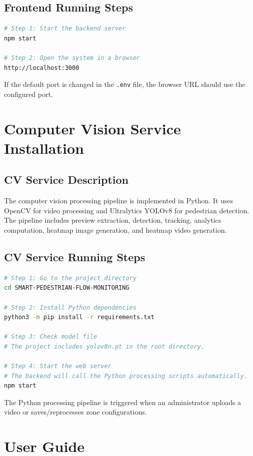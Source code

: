 \documentclass[12pt,a4paper]{report}
\begin{document}
\subsection{Frontend Running Steps}

\begin{lstlisting}[language=bash]
# Step 1: Start the backend server
npm start

# Step 2: Open the system in a browser
http://localhost:3000
\end{lstlisting}

If the default port is changed in the \texttt{.env} file, the browser URL should use the configured port.

\section{Computer Vision Service Installation}

\subsection{CV Service Description}

The computer vision processing pipeline is implemented in Python. It uses OpenCV for video processing and Ultralytics YOLOv8 for pedestrian detection. The pipeline includes preview extraction, detection, tracking, analytics computation, heatmap image generation, and heatmap video generation.

\subsection{CV Service Running Steps}

\begin{lstlisting}[language=bash]
# Step 1: Go to the project directory
cd SMART-PEDESTRIAN-FLOW-MONITORING

# Step 2: Install Python dependencies
python3 -m pip install -r requirements.txt

# Step 3: Check model file
# The project includes yolov8n.pt in the root directory.

# Step 4: Start the web server
# The backend will call the Python processing scripts automatically.
npm start
\end{lstlisting}

The Python processing pipeline is triggered when an administrator uploads a video or saves/reprocesses zone configurations.

\section{User Guide}
\end{document}
